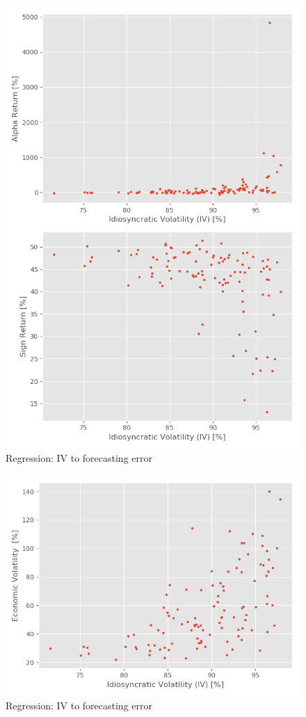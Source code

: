 \begin{figure}[h]
    \centering
    \includegraphics[scale = 0.7]{Plot/IndividualStockRegressions.png}
    \caption{Regression: IV to forecasting error}
    \label{visualization}
\end{figure}

\begin{figure}[h]
    \centering
    \includegraphics[scale = 0.7]{Plot/IVvsEconomicVolatilityRegression.png}
    \caption{Regression: IV to forecasting error}
    \label{visualization}
\end{figure}


